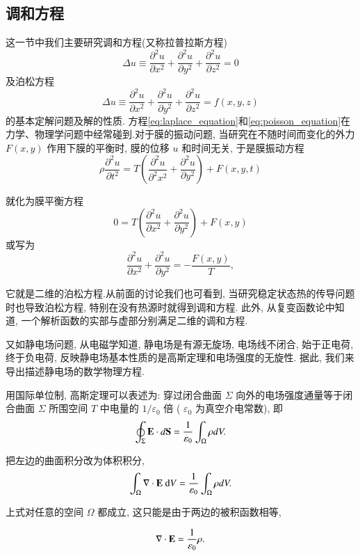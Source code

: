 \subsection{调和方程}
这一节中我们主要研究调和方程(又称拉普拉斯方程)
\begin{equation}
    \Delta u \equiv \frac{\partial^2 u}{\partial x^2}+\frac{\partial^2 u}{\partial y^2}+\frac{\partial^2 u}{\partial z^2}=0
    \label{eq:laplace_equation}
\end{equation}
及泊松方程
\begin{equation}
    \Delta u \equiv \frac{\partial^2 u}{\partial x^2}+\frac{\partial^2 u}{\partial y^2}+\frac{\partial^2 u}{\partial z^2}=f(x, y, z)
    \label{eq:poisson_equation}
\end{equation}
的基本定解问题及解的性质.
方程\ref{eq:laplace_equation}和\ref{eq:poisson_equation}在力学、物理学问题中经常碰到.对于膜的振动问题, 
当研究在不随时间而变化的外力 $F(x, y)$ 
作用下膜的平衡时, 膜的位移 $u$ 和时间无关, 于是膜振动方程
$$
\rho \frac{\partial^2 u}{\partial t^2}=T\left(\frac{\partial^2 u}{\partial^2 x^2}
+\frac{\partial^2 u}{\partial y^2}\right)+F(x, y, t)
$$

就化为膜平衡方程
$$
0=T\left(\frac{\partial^2 u}{\partial x^2}+\frac{\partial^2 u}{\partial y^2}\right)+F(x, y)
$$
或写为
$$
\frac{\partial^2 u}{\partial x^2}+\frac{\partial^2 u}{\partial y^2}=-\frac{F(x, y)}{T},
$$

它就是二维的泊松方程.从前面的讨论我们也可看到, 
当研究稳定状态热的传导问题时也导致泊松方程, 特别在没有热源时就得到调和方程. 
此外, 从复变函数论中知道, 一个解析函数的实部与虚部分别满足二维的调和方程.

又如静电场问题, 从电磁学知道, 静电场是有源无旋场, 电场线不闭合, 始于正电荷, 
终于负电荷, 反映静电场基本性质的是高斯定理和电场强度的无旋性. 据此, 我们来导出描述静电场的数学物理方程.

用国际单位制, 高斯定理可以表述为: 穿过闭合曲面 $\Sigma$ 向外的电场强度通量等于闭合曲面 $\Sigma$ 
所围空间 $T$ 中电量的 $1 / \varepsilon_0$ 倍 ( $\varepsilon_0$ 为真空介电常数), 即
$$
\oint_{\Sigma} {\mathbf{E}} \cdot d {\mathbf{S}}=\frac{1}{\varepsilon_0} \int_{\Omega} \rho d V .
$$

把左边的曲面积分改为体积积分,
$$
\int_{\Omega} \nabla \cdot {\mathbf{E}} \mathrm{~d} V=\frac{1}{\varepsilon_0} \int_{\Omega} \rho d V .
$$

上式对任意的空间 $\Omega$ 都成立, 这只能是由于两边的被积函数相等,

\begin{equation}
    \nabla \cdot {\mathbf{E}}=\frac{1}{\varepsilon_0} \rho .
    \label{eq:nabla_dot_E}
\end{equation}

